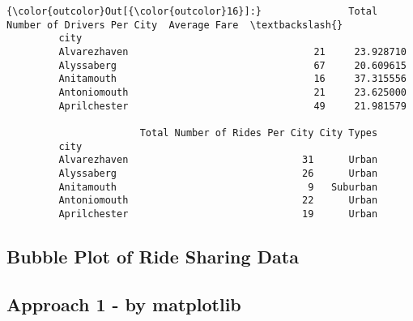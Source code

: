 \documentclass[11pt]{article}
\begin{document}
\begin{Verbatim}[commandchars=\\\{\}]
{\color{outcolor}Out[{\color{outcolor}16}]:}               Total Number of Drivers Per City  Average Fare  \textbackslash{}
         city                                                           
         Alvarezhaven                                21     23.928710   
         Alyssaberg                                  67     20.609615   
         Anitamouth                                  16     37.315556   
         Antoniomouth                                21     23.625000   
         Aprilchester                                49     21.981579   
         
                       Total Number of Rides Per City City Types  
         city                                                     
         Alvarezhaven                              31      Urban  
         Alyssaberg                                26      Urban  
         Anitamouth                                 9   Suburban  
         Antoniomouth                              22      Urban  
         Aprilchester                              19      Urban  
\end{Verbatim}
            
    \subsection{Bubble Plot of Ride Sharing
Data}\label{bubble-plot-of-ride-sharing-data}

    \subsection{Approach 1 - by
matplotlib}\label{approach-1---by-matplotlib}
\end{document}
